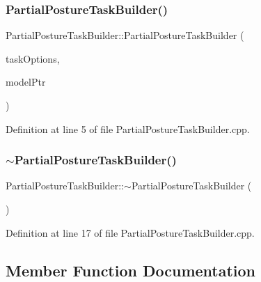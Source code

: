\subsubsection{\texorpdfstring{Partial\+Posture\+Task\+Builder()}{PartialPostureTaskBuilder()}}
{\footnotesize\ttfamily Partial\+Posture\+Task\+Builder\+::\+Partial\+Posture\+Task\+Builder (\begin{DoxyParamCaption}\item[{const \hyperlink{classocra_1_1TaskBuilderOptions}{Task\+Builder\+Options} \&}]{task\+Options,  }\item[{Model\+::\+Ptr}]{model\+Ptr }\end{DoxyParamCaption})}



Definition at line 5 of file Partial\+Posture\+Task\+Builder.\+cpp.

\hypertarget{classocra_1_1PartialPostureTaskBuilder_a59c3cec0e4480654c360af17dc195b5a}{}\label{classocra_1_1PartialPostureTaskBuilder_a59c3cec0e4480654c360af17dc195b5a} 
\subsubsection{\texorpdfstring{$\sim$\+Partial\+Posture\+Task\+Builder()}{~PartialPostureTaskBuilder()}}
{\footnotesize\ttfamily Partial\+Posture\+Task\+Builder\+::$\sim$\+Partial\+Posture\+Task\+Builder (\begin{DoxyParamCaption}{ }\end{DoxyParamCaption})\hspace{0.3cm}{\ttfamily [virtual]}}



Definition at line 17 of file Partial\+Posture\+Task\+Builder.\+cpp.



\subsection{Member Function Documentation}
\hypertarget{classocra_1_1PartialPostureTaskBuilder_ab4a80855ccc820bbeabf4eed87487784}{}\label{classocra_1_1PartialPostureTaskBuilder_ab4a80855ccc820bbeabf4eed87487784} 
